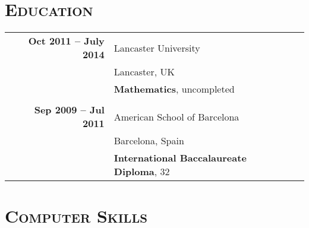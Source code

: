 \documentclass[a4paper,10pt]{article} %
\begin{document}
\section{\textsc{Education}}

\begin{tabularx}{\textwidth}{XrlXr}
  &  \textbf{Oct 2011 -- July 2014} & Lancaster University & &\\
  &                                 & Lancaster, UK & & \\
  &                                 & \textbf{Mathematics}, uncompleted & &\\
\multicolumn{5}{c}{}\\ %
  &  \textbf{Sep 2009 -- Jul 2011}  & American School of Barcelona & &\\
  &                                 & Barcelona, Spain & &\\
  &                                 & \textbf{International Baccalaureate Diploma}, 32 & &\\
\end{tabularx}


\section{\textsc{Computer Skills}}
\end{document}
